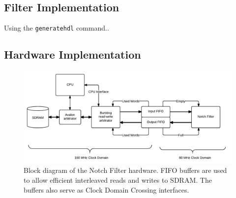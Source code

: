 \documentclass[]{article}
\begin{document}
                                      
                                      
                                      
                                      
                                      




\subsection{Filter Implementation} %
\label{sub:filter_implementation}

Using the \verb"generatehdl" command..




\subsection{Hardware Implementation} %
\label{sub:hardware_implementation}

\begin{figure}[htbp]
	\begin{center}
		\includegraphics[width = \textwidth]{DSDNotch.pdf}
	\end{center}
	\caption{Block diagram of the Notch Filter hardware. FIFO buffers are used to allow efficient interleaved reads and writes to SDRAM. The buffers also serve as Clock Domain Crossing interfaces.}
	\label{fig:DSDNotch}
\end{figure}
\end{document}
